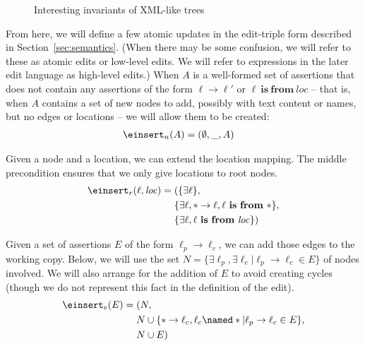 \documentclass{article}
\newcommand{\mbf}[1]{\ensuremath{\mathbf{#1}}}
\newcommand{\loc}{\ensuremath{\mathit{loc}}\xspace}
\newcommand{\isfrom}{\ \mbf{is}\ \mbf{from}\ }
\begin{document}
\begin{figure}
    \infrule[LocRoot]{\ell\isfrom\loc}{\forall \ell'.\lnot(\ell' \to \ell)}
    \vspace{2ex}
    \vspace{2ex}
    \vspace{2ex}
    \vspace{2ex}
    \vspace{2ex}
    \caption{Interesting invariants of XML-like trees}
    \label{fig:interesting store}
\end{figure}

From here, we will define a few atomic updates in the edit-triple form
described in Section~\ref{sec:semantics}. (When there may be some confusion,
we will refer to these as atomic edits or low-level edits.  We will refer to
expressions in the later edit language as high-level edits.) When $A$ is a
well-formed set of assertions that does not contain any assertions of the
form $\ell\to\ell'$ or $\ell \isfrom \loc$ -- that is, when $A$ contains a
set of new nodes to add, possibly with text content or names, but no edges
or locations -- we will allow them to be created:
\begin{align*}
    \einsert_n(A) &= (\emptyset,\_,A)
\end{align*}

Given a node and a location, we can extend the location mapping. The middle
precondition ensures that we only give locations to root nodes.
\begin{align*}
    \einsert_r(\ell,\loc) ={}
        & (\{\exists\ell\}, \\
        & \{\exists\ell,*\to\ell,\ell\isfrom*\}, \\
        & \{\exists\ell,\ell\isfrom\loc\})
\end{align*}

Given a set of assertions $E$ of the form $\ell_p\to\ell_c$, we can add
those edges to the working copy. Below, we will use the set
$N=\{\exists\ell_p,\exists\ell_c | \ell_p\to\ell_c \in E\}$ of nodes
involved. We will also arrange for the addition of $E$ to avoid creating
cycles (though we do not represent this fact in the definition of the edit).
\begin{align*}
    \einsert_e(E) ={}
        & (N, \\
        & N\cup\{*\to\ell_c,\ell_c\named* | \ell_p\to\ell_c \in E\}, \\
        & N \cup E)
\end{align*}
\end{document}
